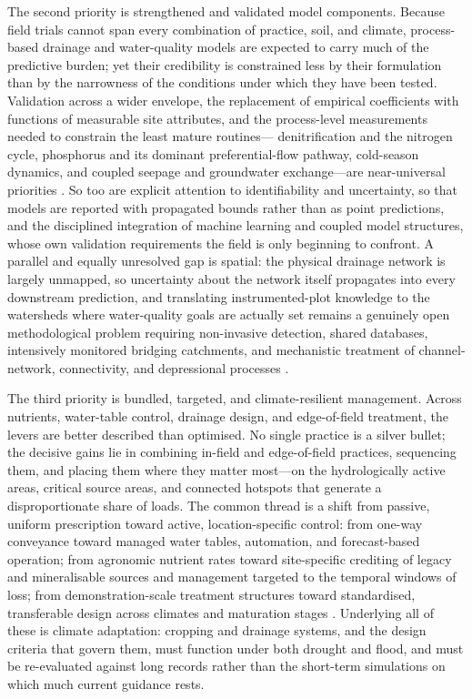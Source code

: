 The second priority is strengthened and validated model components. Because
field trials cannot span every combination of practice, soil, and climate,
process-based drainage and water-quality models are expected to carry much
of the predictive burden; yet their credibility is constrained less by their
formulation than by the narrowness of the conditions under which they have
been tested. Validation across a wider envelope, the replacement of
empirical coefficients with functions of measurable site attributes, and the
process-level measurements needed to constrain the least mature routines---
denitrification and the nitrogen cycle, phosphorus and its dominant
preferential-flow pathway, cold-season dynamics, and coupled seepage and
groundwater exchange---are near-universal priorities \parencite{Youssef2006,Radcliffe2015}. So too are explicit
attention to identifiability and uncertainty, so that models are reported
with propagated bounds rather than as point predictions, and the disciplined
integration of machine learning and coupled model structures, whose own
validation requirements the field is only beginning to confront. A parallel
and equally unresolved gap is spatial: the physical drainage network is
largely unmapped, so uncertainty about the network itself propagates into
every downstream prediction, and translating instrumented-plot knowledge to
the watersheds where water-quality goals are actually set remains a genuinely
open methodological problem requiring non-invasive detection, shared
databases, intensively monitored bridging catchments, and mechanistic
treatment of channel-network, connectivity, and depressional processes \parencite{Amado2018,Naz2009}.

The third priority is bundled, targeted, and climate-resilient management.
Across nutrients, water-table control, drainage design, and edge-of-field
treatment, the levers are better described than optimised. No single practice
is a silver bullet; the decisive gains lie in combining in-field and
edge-of-field practices, sequencing them, and placing them where they matter
most---on the hydrologically active areas, critical source areas, and
connected hotspots that generate a disproportionate share of loads. The
common thread is a shift from passive, uniform prescription toward active,
location-specific control: from one-way conveyance toward managed water
tables, automation, and forecast-based operation; from agronomic nutrient
rates toward site-specific crediting of legacy and mineralisable sources and
management targeted to the temporal windows of loss; from demonstration-scale
treatment structures toward standardised, transferable design across
climates and maturation stages \parencite{Randall2001,Strock2011,Christianson2021}. Underlying all of these is climate
adaptation: cropping and drainage systems, and the design criteria that
govern them, must function under both drought and flood, and must be
re-evaluated against long records rather than the short-term simulations on
which much current guidance rests.

